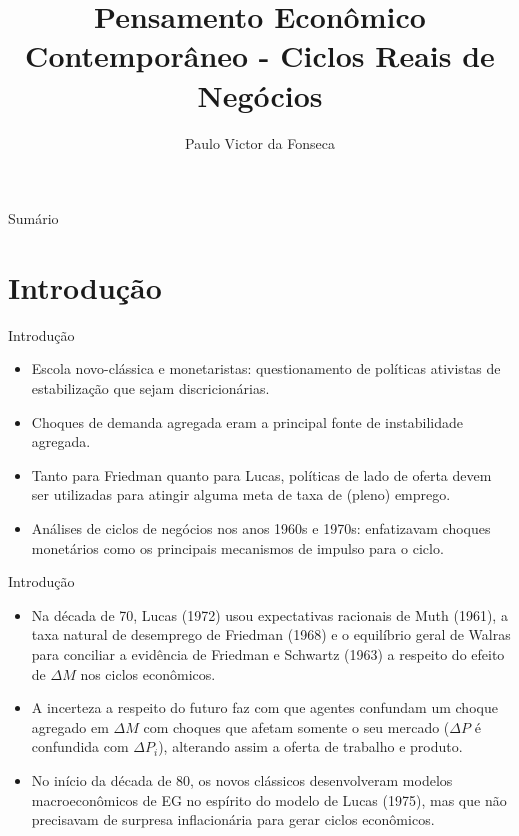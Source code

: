 \documentclass[10pt]{beamer}
\title[]{Pensamento Econômico Contemporâneo - Ciclos Reais de Negócios}
\author[]{Paulo Victor da Fonseca}
\date{}
\begin{document}
\begin{frame}[plain]
\end{frame}

\begin{frame}{Sumário}
    \tableofcontents
\end{frame}

\section{Introdução}
\begin{frame}{Introdução}
    \begin{itemize}
        \item Escola novo-clássica e monetaristas: questionamento de políticas ativistas de estabilização que sejam discricionárias.
        \bigskip
        \item Choques de demanda agregada eram a principal fonte de instabilidade agregada.
        \bigskip
        \item Tanto para Friedman quanto para Lucas, políticas de lado de oferta devem ser utilizadas para atingir alguma meta de taxa de (pleno) emprego.
        \bigskip
        \item Análises de ciclos de negócios nos anos 1960s e 1970s: enfatizavam choques monetários como os principais mecanismos de impulso para o ciclo.
    \end{itemize}
\end{frame}

\begin{frame}{Introdução}
    \begin{itemize}
        \item Na década de 70, Lucas (1972) usou expectativas racionais de Muth (1961), a taxa natural de desemprego de Friedman (1968) e o
equilíbrio geral de Walras para conciliar a evidência de Friedman e
Schwartz (1963) a respeito do efeito de $\Delta M$ nos ciclos econômicos.
\bigskip
\item A incerteza a respeito do futuro faz com que agentes
confundam um choque agregado em $\Delta M$ com choques que afetam
somente o seu mercado ($\Delta P$ é confundida com $\Delta P_i$), alterando assim a oferta de trabalho e produto.
\bigskip
\item No início da década de 80, os novos clássicos desenvolveram modelos
macroeconômicos de EG no espírito do modelo de Lucas (1975), mas
que não precisavam de surpresa inflacionária para gerar ciclos
econômicos.
    \end{itemize}
\end{frame}
\end{document}
